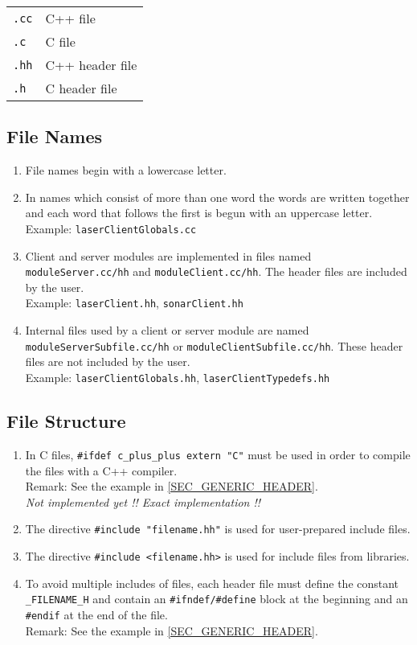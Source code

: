 \begin{tabular}{ll}
  {\tt .cc}  & C++ file \\
  {\tt .c}   & C file \\
  {\tt .hh}  & C++ header file\\
  {\tt .h}   & C header file \\
\end{tabular}


\subsection{File Names}

\begin{enumerate}
\item File names begin with a lowercase letter.
\item In names which consist of more than one word the words are
  written together and each word that follows the first is begun with an
  uppercase letter. \\ 
  Example: {\tt laserClientGlobals.cc}
\item Client and server modules are implemented in files named
  {\tt moduleServer.cc/hh} and {\tt moduleClient.cc/hh}. The header
  files are included by the user. \\ 
  Example: {\tt laserClient.hh}, {\tt sonarClient.hh}
\item Internal files used by a client or server module are named
  {\tt moduleServerSubfile.cc/hh} or {\tt moduleClientSubfile.cc/hh}.
  These header files are not included by the user. \\
  Example: {\tt laserClientGlobals.hh}, {\tt laserClientTypedefs.hh}
\end{enumerate}


\subsection{File Structure}
\label{SEC_FILE_STRUCTURE}

\begin{enumerate}
\item In C files, {\tt \#ifdef c\_plus\_plus extern "C"} must be
  used in order to compile the files with a C++ compiler. \\
  Remark: See the example in \ref{SEC_GENERIC_HEADER}. \\
  {\em Not implemented yet !!    Exact implementation !!}
\item The directive {\tt \#include "filename.hh"} is used for
  user-prepared include files.
\item The directive {\tt \#include <filename.hh>} is used for
  include files from libraries.
\item To avoid multiple includes of files, each header file must
  define the constant {\tt \_FILENAME\_H} and contain an
  {\tt \#ifndef/\#define} block at the beginning and an
  {\tt \#endif} at the end of the file. \\
  Remark: See the example in \ref{SEC_GENERIC_HEADER}. 
\end{enumerate}


